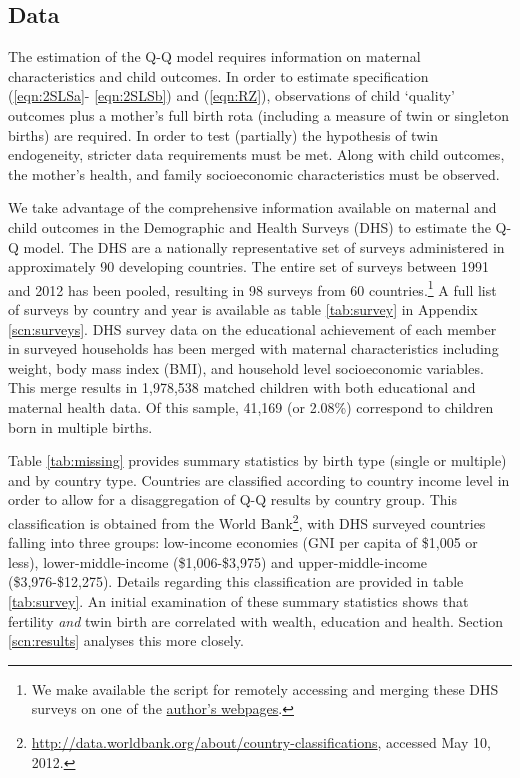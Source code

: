 \documentclass{article}[11pt,subeqn]
\begin{document}
\begin{spacing}{1.5}
\vspace{-5mm}
\section{Data}
\label{scn:data}
\vspace{-5mm}
The estimation of the Q-Q model requires information on maternal characteristics and child outcomes. In order to estimate specification (\ref{eqn:2SLSa}-%
\ref{eqn:2SLSb}) and (\ref{eqn:RZ}), observations of child `quality' outcomes plus a mother's full birth rota (including a measure of twin or singleton 
births) are required.  In order to test (partially) the hypothesis of twin endogeneity, stricter data requirements 
must be met.  Along with child outcomes, the mother's health, and family socioeconomic characteristics must be observed.

We take advantage of the comprehensive information available on maternal and child outcomes in the Demographic and Health Surveys (DHS) 
to estimate the Q-Q model.  The DHS are a nationally representative set of surveys administered in approximately 90 developing countries.  
The entire set of surveys between 1991 and 2012 has been pooled, resulting in 98 surveys from 60 countries.\footnote{We make available the script
for remotely accessing and merging these DHS surveys on one of the \href{https://sites.google.com/site/damiancclarke/computation\#TOC-The-Demographic-and-Health-Surveys}
{author's webpages}.}  A full list of surveys by 
country and year is available as table \ref{tab:survey} in Appendix \ref{scn:surveys}.  DHS survey data on the educational achievement 
of each member in surveyed households has been merged with maternal characteristics including weight, body mass index (BMI), and 
household level socioeconomic variables.  This merge results in 1,978,538 matched children with both educational and maternal health
data.  Of this sample, 41,169 (or 2.08\%) correspond to children born in multiple births.

Table \ref{tab:missing} provides summary statistics by birth type (single or multiple) and by country type.  Countries are classified 
according to country income level in order to allow for a disaggregation of Q-Q results by country group.  This classification is obtained
from the World Bank\footnote{\url{http://data.worldbank.org/about/country-classifications},  accessed May 10, 2012.}, with DHS
surveyed countries falling into three groups: low-income economies (GNI per capita of \$1,005 or less), lower-middle-income (\$1,006-\$3,975)
and upper-middle-income (\$3,976-\$12,275).  Details regarding this classification are provided in table \ref{tab:survey}.  An initial 
examination of these summary statistics shows that fertility \emph{and} twin birth are correlated with wealth, education and health.
Section \ref{scn:results} analyses this more closely.


\end{spacing}
\end{document}
